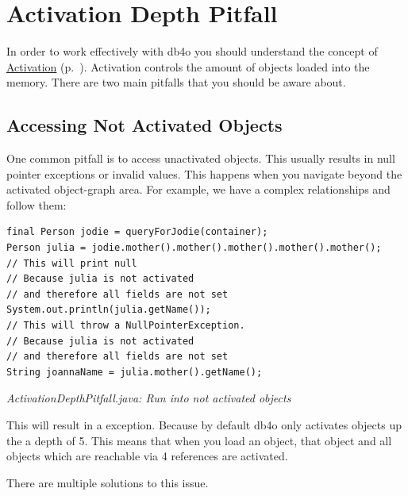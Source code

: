 \section{Activation Depth Pitfall}
\label{ref:usage-pitfalls-activation-depth}

In order to work effectively with db4o you should understand the concept of \hyperref[ref:basics-activation]{Activation} (p.~\pageref{ref:basics-activation}). Activation controls the amount of objects loaded into the memory. There are two main pitfalls that you should be aware about.

\subsection*{Accessing Not Activated Objects}

One common pitfall is to access unactivated objects. This usually results in null pointer exceptions or invalid values. This happens when you navigate beyond the activated object-graph area. For example, we have a complex relationships and follow them:

\begin{lstlisting}
final Person jodie = queryForJodie(container);
Person julia = jodie.mother().mother().mother().mother().mother();
// This will print null
// Because julia is not activated
// and therefore all fields are not set
System.out.println(julia.getName());
// This will throw a NullPointerException.
// Because julia is not activated
// and therefore all fields are not set
String joannaName = julia.mother().getName();
\end{lstlisting}

{\small\itshape ActivationDepthPitfall.java: Run into not activated objects\par}
\medskip

This will result in a exception. Because by default db4o only activates objects up the a depth of 5. This means that when you load an object, that object and all objects which are reachable via 4 references are activated.

There are multiple solutions to this issue.

